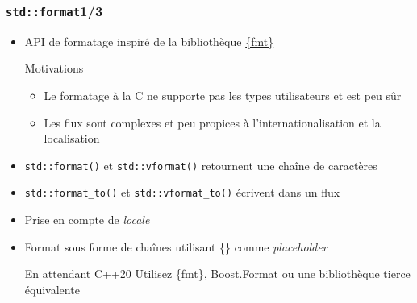 \documentclass[C++.tex]{subfiles}
\begin{document}
\begin{frame}[fragile]
	\frametitle{\lstinline|std::format|\titlehfill{}1/3}
	\begin{itemize}
		\item API de formatage inspiré de la bibliothèque  \href{https://github.com/fmtlib/fmt}{\{fmt\}}
		
		\begin{block}{Motivations}
			\begin{itemize}
				\item Le formatage \og à la C\fg{} ne supporte pas les types utilisateurs et est peu sûr


				\item Les flux sont complexes et peu propices à l'internationalisation et la localisation

			\end{itemize}
		\end{block}
	
		\item \lstinline|std::format()| et \lstinline|std::vformat()| retournent une chaîne de caractères
		\item \lstinline|std::format_to()| et \lstinline|std::vformat_to()| écrivent dans un flux
		\item Prise en compte de \textit{locale}
		\item Format sous forme de chaînes utilisant \{\} comme \textit{placeholder}

		\begin{block}{En attendant C++20}
			Utilisez \{fmt\}, Boost.Format ou une bibliothèque tierce équivalente
		\end{block}
	\end{itemize}
\end{frame}
\end{document}

